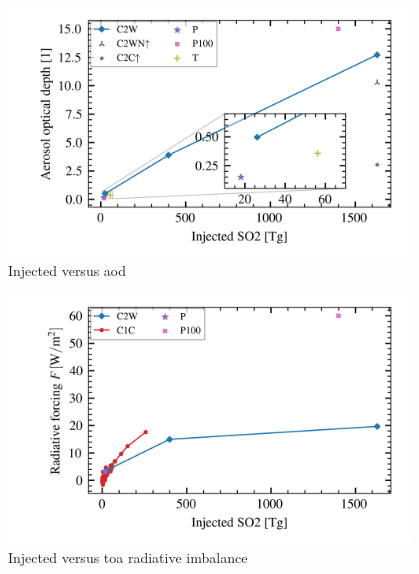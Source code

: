 \documentclass{ametsocV5}
\begin{document}
\begin{figure}
  \begin{center}
    \includegraphics[width=0.95\textwidth]{figures/injection_vs_aod.png}
  \end{center}
  \caption{Injected  versus \acrshort{aod}}
  \label{fig:so2_vs_aod}
\end{figure}

\begin{figure}
  \begin{center}
    \includegraphics[width=0.95\textwidth]{figures/injection_vs_toa.png}
  \end{center}
  \caption{Injected  versus \acrshort{toa} radiative imbalance}
  \label{fig:so2_vs_toa}
\end{figure}
\end{document}
